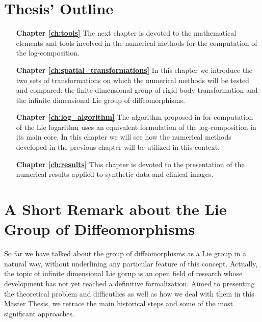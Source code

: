 \section{Thesis' Outline}\label{se:thesis_outline}
\begin{enumerate}
	
	\item[{\bf Chapter \ref{ch:tools}}] The next chapter is devoted to the mathematical elements and tools involved in the numerical methods for the computation of the log-composition.
	
	\item[{\bf Chapter \ref{ch:spatial_transformations}}] In this chapter we introduce the two sets of transformations on which the numerical methods will be tested and compared: the finite dimensional group of rigid body transformation and the infinite dimensional Lie group of diffeomorphisms.

	\item[{\bf Chapter \ref{ch:log_algorithm}}] The algorithm proposed in \cite{bossa2008algorithms} for computation of the Lie logarithm uses an equivalent formulation of the log-composition in its main core. In this chapter we will see how the numerical methods developed in the previous chapter will be utilized in this context.
  
	\item[{\bf Chapter \ref{ch:results}}] This chapter is devoted to the presentation of the numerical results applied to synthetic data and clinical images. 
	
\end{enumerate}


\section*{A Short Remark about the Lie Group of Diffeomorphisms}

So far we have talked about the group of diffeomorphisms as a Lie group in a natural way, without underlining any particular feature of this concept. Actually, the topic of infinite dimensional Lie gorup is an open field of research whose development has not yet reached a definitive formalization.
Aimed to presenting the theoretical problem and difficutlies as well as how we deal with them in this Master Thesis, we retrace the main historical steps and some of the most significant approaches.

